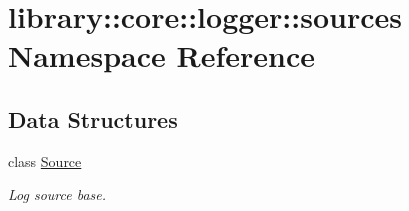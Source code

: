 \hypertarget{namespacelibrary_1_1core_1_1logger_1_1sources}{}\section{library\+:\+:core\+:\+:logger\+:\+:sources Namespace Reference}
\label{namespacelibrary_1_1core_1_1logger_1_1sources}
\subsection*{Data Structures}
\begin{DoxyCompactItemize}
\item 
class \hyperlink{classlibrary_1_1core_1_1logger_1_1sources_1_1Source}{Source}
\begin{DoxyCompactList}\small\item\em Log source base. \end{DoxyCompactList}\end{DoxyCompactItemize}
